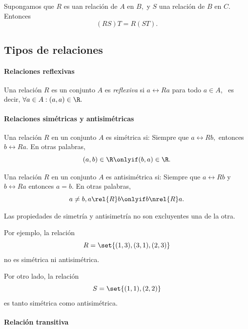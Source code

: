 	\begin{teorema}
		Supongamos que $R$ es uan relación de $A$ en $B,$ y $S$ una relación de $B$ en $C.$ Entonces
		$$
		(RS)T=R(ST).
		$$
	\end{teorema}



\subsection{Tipos de relaciones}

\paragraph{Relaciones reflexivas}



	Una relación $R$ es un conjunto $A$ es \emph{reflexiva} si $a\rel{R}a$ para todo $a\in A$, \, es decir, $\forall a \in A: (a,a)\in \R.$




\paragraph{Relaciones sim\'etricas y antisim\'etricas}


	Una relación $R$ en un conjunto $A$ es sim\'etrica si: Siempre que $a\rel{R}b,$ entonces $b\rel{R}a.$  En otras palabras,
	$$
	(a,b)\in \R \onlyif (b,a)\in \R.
	$$





	Una relación $R$ en un conjunto $A$ es antisim\'etrica si: Siempre que $a\rel{R}b$ y $b\rel{R}a$ entonces $a=b.$  En otras palabras,
	$$
	a\neq b, a\rel{R}b \onlyif b\nrel{R}a.
	$$



	\begin{observacion}
		Las propiedades de simetría y antisimetría no son excluyentes una de la otra.

		Por ejemplo, la relación $$R=\set{(1,3),(3,1),(2,3)}$$ no es sim\'etrica ni antisim\'etrica.

		Por otro lado, la relación $$S=\set{(1,1),(2,2)}$$ es tanto sim\'etrica como antisim\'etrica.
	\end{observacion}



\paragraph{Relación transitiva}


